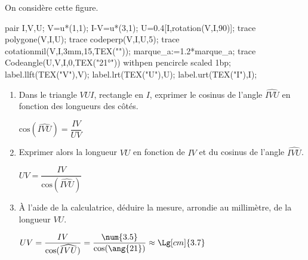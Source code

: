     On considère cette figure.

    \begin{Geometrie}
        pair I,V,U;
        V=u*(1,1);
        I-V=u*(3,1);
        U=0.4[I,rotation(V,I,90)];
        trace polygone(V,I,U);
        trace codeperp(V,I,U,5);
        trace cotationmil(V,I,3mm,15,TEX(""));
        marque_a:=1.2*marque_a;
        trace Codeangle(U,V,I,0,TEX("\ang{21}")) withpen pencircle scaled 1bp;
        label.llft(TEX("V"),V);
        label.lrt(TEX("U"),U);
        label.urt(TEX("I"),I);
    \end{Geometrie}

    \begin{enumerate}
        \item Dans le triangle $VUI$, rectangle en $I$, exprimer le cosinus de l'angle $\widehat{IVU}$ en fonction des longueurs des côtés.

        {\color{red} $\text{cos}(\widehat{IVU})=\dfrac{IV}{UV}$}
        \item Exprimer alors la longueur $VU$ en fonction de $IV$ et du cosinus de l'angle $\widehat{IVU}$.

        {\color{red} $UV=\dfrac{IV}{\text{cos}(\widehat{IVU})}$}
        \item À l'aide de la calculatrice, déduire la mesure, arrondie au millimètre, de la longueur $VU$.

        {\color{red} $UV=\dfrac{IV}{\text{cos}(\widehat{IVU})}=\dfrac{\num{3.5}}{\text{cos}(\ang{21})}\approx\Lg[cm]{3.7}$}
    \end{enumerate}
